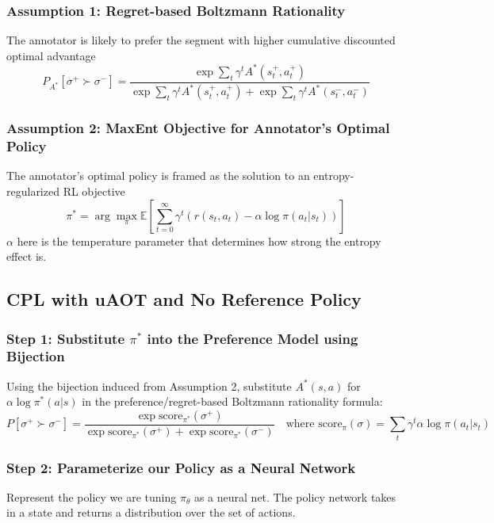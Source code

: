 \documentclass[11pt]{article}
\begin{document}
\subsubsection*{Assumption 1: Regret-based Boltzmann Rationality}
The annotator is likely to prefer the segment with higher cumulative discounted optimal advantage
$$P_{A^*}[\sigma^+ \succ \sigma^-] = \frac{\exp \sum_t \gamma^t A^*(s_t^+, a_t^+)}{\exp \sum_t \gamma^t A^*(s_t^+, a_t^+) + \exp \sum_t \gamma^t A^*(s_t^-, a_t^-)}$$

\subsubsection*{Assumption 2: MaxEnt Objective for Annotator's Optimal Policy}
The annotator's optimal policy is framed as the solution to an entropy-regularized RL objective
$$\pi^* = \arg\max_\pi \mathbb{E} \left[ \sum_{t=0}^\infty \gamma^t (r(s_t, a_t) - \alpha \log \pi(a_t|s_t)) \right]$$
$\alpha$ here is the temperature parameter that determines how strong the entropy effect is.\\


\newpage
\subsection{CPL with uAOT and No Reference Policy}

\subsubsection*{Step 1: Substitute $\pi^*$ into the Preference Model using Bijection}
Using the bijection induced from Assumption 2, substitute $A^*(s, a)$ for $\alpha \log \pi^*(a|s)$ in the preference/regret-based Boltzmann rationality formula:
$$P[\sigma^+ \succ \sigma^-] = \frac{\exp \text{score}_{\pi^*}(\sigma^+)}{\exp \text{score}_{\pi^*}(\sigma^+) + \exp \text{score}_{\pi^*}(\sigma^-)} \quad \text{where } \text{score}_\pi(\sigma) = \sum_t \gamma^t \alpha \log \pi(a_t|s_t)$$

\subsubsection*{Step 2: Parameterize our Policy as a Neural Network}
Represent the policy we are tuning $\pi_\theta$ as a neural net. The policy network takes in a state and returns a distribution over the set of actions.
\end{document}
